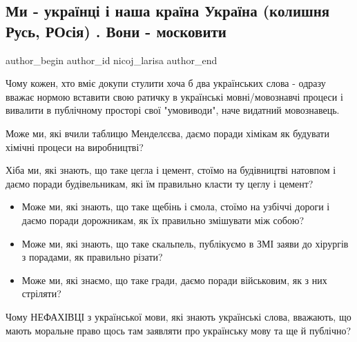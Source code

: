  
 
 
 
 
 
\subsection{Ми - українці і наша країна Україна (колишня Русь, РОсія) . Вони - московити}
\label{sec:12_08_2021.fb.nicoj_larisa.1.rossia_slovo_moskovia}
 
\ifcmt
 author_begin
   author_id nicoj_larisa
 author_end
\fi

Чому кожен, хто вміє докупи стулити хоча б два українських слова - одразу
вважає нормою вставити свою ратичку в українські мовні/мовознавчі процеси і
вивалити в публічному просторі свої "умовиводи", наче видатний мовознавець. 

Може ми, які вчили таблицю Менделєєва, даємо поради хімікам  як будувати
хімічні процеси на виробництві?

Хіба ми, які знають, що таке цегла і цемент, стоїмо на будівництві натовпом і
даємо поради будівельникам, які їм правильно класти ту цеглу і цемент?

\begin{itemize}
  \item Може ми, які знають, що таке щебінь і смола, стоїмо на узбіччі дороги і даємо поради дорожникам, як їх правильно змішувати між собою? 
  \item Може ми, які знають, що таке скальпель, публікуємо в ЗМІ заяви до хірургів з порадами, як правильно різати?
  \item Може ми, які знаємо, що таке гради, даємо поради військовим, як з них стріляти? 
\end{itemize}

Чому НЕФАХІВЦІ з української мови, які знають українські слова, вважають, що
мають моральне право щось там заявляти про українську мову та ще й публічно? 

